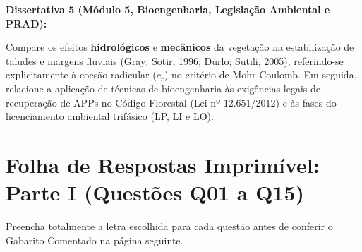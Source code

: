 \noindent\textbf{Dissertativa 5 (Módulo 5, Bioengenharia, Legislação Ambiental e PRAD):}\par
Compare os efeitos \textbf{hidrológicos} e \textbf{mecânicos} da vegetação na estabilização de taludes e margens fluviais (Gray; Sotir, 1996; Durlo; Sutili, 2005), referindo-se explicitamente à coesão radicular ($c_r$) no critério de Mohr-Coulomb. Em seguida, relacione a aplicação de técnicas de bioengenharia às exigências legais de recuperação de APPs no Código Florestal (Lei nº 12.651/2012) e às fases do licenciamento ambiental trifásico (LP, LI e LO).
\espacoResolucao[3.2cm]

\clearpage
\section*{Folha de Respostas Imprimível: Parte I (Questões Q01 a Q15)}

\noindent Preencha totalmente a letra escolhida para cada questão antes de conferir o Gabarito Comentado na página seguinte.

